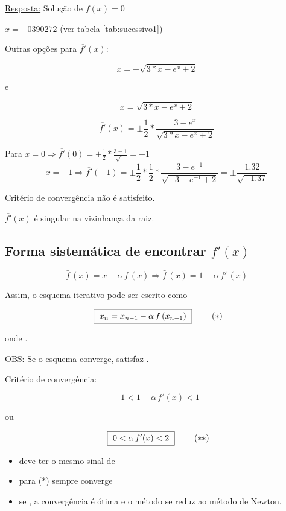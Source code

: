 \begin{example}
\begin{enumerate}
\underline{Resposta:} Solução de $f(x) = 0$

$x = -0390272$ (ver tabela \ref{tab:sucessivo1})

Outras opções para $\overline{f'}(x):$

\[
 x = - \sqrt{3 \ast x - e^{x} + 2}
\]

e

\[
 x = \sqrt{3 \ast x - e^{x} + 2}
\]

\[
 \overline{f'}(x) = \pm \frac{1}{2} \ast \frac{3 - e^{x}}{\sqrt{3 \ast x - e^{x} + 2}}
\]

Para $x = 0 \Rightarrow \overline{f'}(0) = \pm \frac{1}{2} \ast \frac{3 - 1}{\sqrt{1}} = \pm 1$
\[
 x= -1 \Rightarrow \overline{f'}(-1) = \pm \frac{1}{2} \ast \frac{1}{2} \ast \frac{3 - e^{-1}}{\sqrt{-3 - e^{-1} + 2}} = \pm \frac{1.32}{\sqrt{-1.37}}
\]

Critério de convergência não é satisfeito.

$\overline{f'}(x)$ é singular na vizinhança da raiz.

\end{enumerate}

\end{example}

\subsection{Forma sistemática de encontrar $\overline{f'}(x)$}

\[
 \bar{f}\,(x) = x - \alpha \, f \, (x) \Rightarrow \bar{f}\,(x) = 1 - \alpha \, f'\,(x)
\]

Assim, o esquema iterativo pode ser escrito como

\[
 \mbox{ \framebox{ $ x_n = x_{n-1} - \alpha \, f\,(x_{n-1}) $ } } \qquad (*)
\]

onde .

OBS: Se o esquema converge,  satisfaz .

Critério de convergência:

\[
-1 < 1 - \alpha \, f'(x) < 1
\]

ou

\[
 \mbox{ \framebox{ $ 0 < \alpha \, f'(x) < 2 $ } } \qquad (**)
\]

\begin{itemize}
 \item \esp{\alpha} deve ter o mesmo sinal de 
 \item para \esp{\alpha \approx 0 \Rightarrow} (*) sempre converge
 \item se  , a convergência é ótima e o método se reduz ao método de Newton.
\end{itemize}

